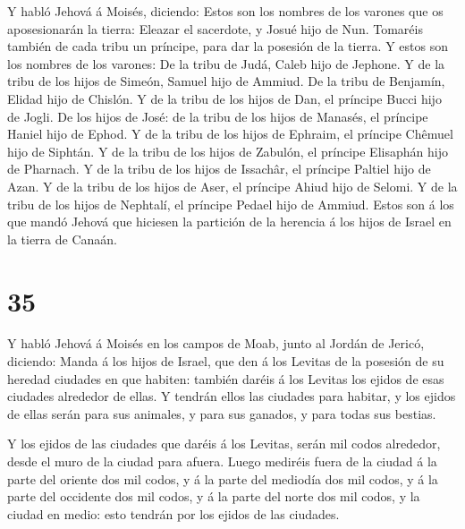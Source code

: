  Y habló Jehová á Moisés, diciendo:  Estos son
los nombres de los varones que os aposesionarán la tierra: Eleazar el
sacerdote, y Josué hijo de Nun.  Tomaréis también de cada
tribu un príncipe, para dar la posesión de la tierra.  Y
estos son los nombres de los varones: De la tribu de Judá, Caleb hijo de
Jephone.  Y de la tribu de los hijos de Simeón, Samuel hijo
de Ammiud.  De la tribu de Benjamín, Elidad hijo de
Chislón.  Y de la tribu de los hijos de Dan, el príncipe
Bucci hijo de Jogli.  De los hijos de José: de la tribu de
los hijos de Manasés, el príncipe Haniel hijo de Ephod.  Y
de la tribu de los hijos de Ephraim, el príncipe Chêmuel hijo de
Siphtán.  Y de la tribu de los hijos de Zabulón, el
príncipe Elisaphán hijo de Pharnach.  Y de la tribu de los
hijos de Issachâr, el príncipe Paltiel hijo de Azan.  Y de
la tribu de los hijos de Aser, el príncipe Ahiud hijo de Selomi.
 Y de la tribu de los hijos de Nephtalí, el príncipe Pedael
hijo de Ammiud.  Estos son á los que mandó Jehová que
hiciesen la partición de la herencia á los hijos de Israel en la tierra
de Canaán.

\hypertarget{section-34}{%
\section{35}\label{section-34}}

 Y habló Jehová á Moisés en los campos de Moab, junto al
Jordán de Jericó, diciendo:  Manda á los hijos de Israel,
que den á los Levitas de la posesión de su heredad ciudades en que
habiten: también daréis á los Levitas los ejidos de esas ciudades
alrededor de ellas.  Y tendrán ellos las ciudades para
habitar, y los ejidos de ellas serán para sus animales, y para sus
ganados, y para todas sus bestias.

 Y los ejidos de las ciudades que daréis á los Levitas,
serán mil codos alrededor, desde el muro de la ciudad para afuera.
 Luego mediréis fuera de la ciudad á la parte del oriente
dos mil codos, y á la parte del mediodía dos mil codos, y á la parte del
occidente dos mil codos, y á la parte del norte dos mil codos, y la
ciudad en medio: esto tendrán por los ejidos de las ciudades.

